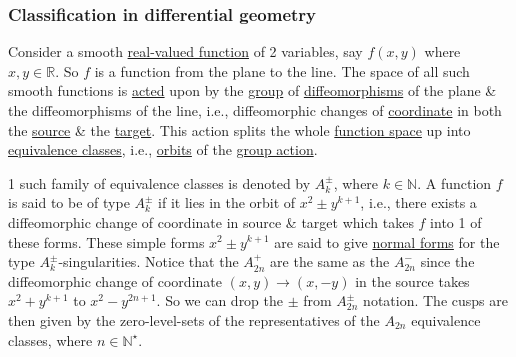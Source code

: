 \documentclass{article}
\begin{document}
\subsubsection{Classification in differential geometry}
Consider a smooth \href{https://en.wikipedia.org/wiki/Real-valued_function}{real-valued function} of 2 variables, say $f(x,y)$ where $x,y\in\mathbb{R}$. So $f$ is a function from the plane to the line. The space of all such smooth functions is \href{https://en.wikipedia.org/wiki/Group_action_(mathematics)}{acted} upon by the \href{https://en.wikipedia.org/wiki/Group_(mathematics)}{group} of \href{https://en.wikipedia.org/wiki/Diffeomorphism}{diffeomorphisms} of the plane \& the diffeomorphisms of the line, i.e., diffeomorphic changes of \href{https://en.wikipedia.org/wiki/Coordinate}{coordinate} in both the \href{https://en.wikipedia.org/wiki/Domain_of_a_function}{source} \& the \href{https://en.wikipedia.org/wiki/Range_of_a_function}{target}. This action splits the whole \href{https://en.wikipedia.org/wiki/Function_space}{function space} up into \href{https://en.wikipedia.org/wiki/Equivalence_class}{equivalence classes}, i.e., \href{https://en.wikipedia.org/wiki/Group_orbit#Orbits_and_stabilizers}{orbits} of the \href{https://en.wikipedia.org/wiki/Group_action_(mathematics)}{group action}.

1 such family of equivalence classes is denoted by \href{https://en.wikipedia.org/wiki/Ak_singularity}{$A_k^\pm$}, where $k\in\mathbb{N}$. A function $f$ is said to be of type $A_k^\pm$ if it lies in the orbit of $x^2\pm y^{k+1}$, i.e., there exists a diffeomorphic change of coordinate in source \& target which takes $f$ into 1 of these forms. These simple forms $x^2\pm y^{k+1}$ are said to give \href{https://en.wikipedia.org/wiki/Canonical_form}{normal forms} for the type $A_k^\pm$-singularities. Notice that the $A_{2n}^+$ are the same as the $A_{2n}^-$ since the diffeomorphic change of coordinate $(x,y)\to(x,-y)$ in the source takes $x^2 + y^{k+1}$ to $x^2 - y^{2n + 1}$. So we can drop the $\pm$ from $A_{2n}^\pm$ notation. The cusps are then given by the zero-level-sets of the representatives of the $A_{2n}$ equivalence classes, where $n\in\mathbb{N}^\star$.
\end{document}
